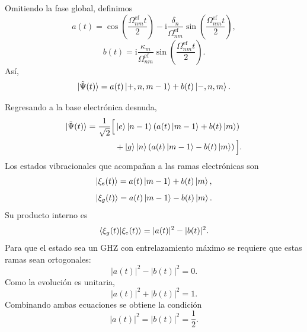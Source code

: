 \documentclass[11pt]{article}
\newcommand{\ii}{\mathrm{i}}
\begin{document}
Omitiendo la fase global, definimos
\begin{equation}
  a(t)
  =
  \cos\left(
  \frac{\Omega_{nm}^{\mathrm{ef}}t}{2}
  \right)
  -
  \ii
  \frac{\delta_n}{\Omega_{nm}^{\mathrm{ef}}}
  \sin\left(
  \frac{\Omega_{nm}^{\mathrm{ef}}t}{2}
  \right),
\end{equation}
\begin{equation}
  b(t)
  =
  \ii
  \frac{\kappa_m}{\Omega_{nm}^{\mathrm{ef}}}
  \sin\left(
  \frac{\Omega_{nm}^{\mathrm{ef}}t}{2}
  \right).
\end{equation}
As\'i,
\begin{equation}
  \ket{\tilde\Psi(t)}
  =
  a(t)\ket{+,n,m-1}
  +
  b(t)\ket{-,n,m}.
\end{equation}

Regresando a la base electr\'onica desnuda,
\begin{equation}
\begin{aligned}
  \ket{\tilde\Psi(t)}
  =
  \frac1{\sqrt2}\Big[&
  \ket e\ket{n-1}
  \left(
  a(t)\ket{m-1}+b(t)\ket m
  \right)
  \\
  &+
  \ket g\ket n
  \left(
  a(t)\ket{m-1}-b(t)\ket m
  \right)
  \Big].
\end{aligned}
\end{equation}
Los estados vibracionales que acompa\~nan a las ramas electr\'onicas son
\begin{equation}
  \ket{\xi_e(t)}
  =
  a(t)\ket{m-1}+b(t)\ket m,
\end{equation}
\begin{equation}
  \ket{\xi_g(t)}
  =
  a(t)\ket{m-1}-b(t)\ket m.
\end{equation}
Su producto interno es
\begin{equation}
  \braket{\xi_g(t)|\xi_e(t)}
  =
  |a(t)|^2-|b(t)|^2.
\end{equation}
Para que el estado sea un GHZ con entrelazamiento m\'aximo se requiere que
estas ramas sean ortogonales:
\begin{equation}
  |a(t)|^2-|b(t)|^2=0.
\end{equation}
Como la evoluci\'on es unitaria,
\begin{equation}
  |a(t)|^2+|b(t)|^2=1.
\end{equation}
Combinando ambas ecuaciones se obtiene la condici\'on
\begin{equation}
  \boxed{
  |a(t)|^2=|b(t)|^2=\frac12.
  }
\end{equation}
\end{document}
